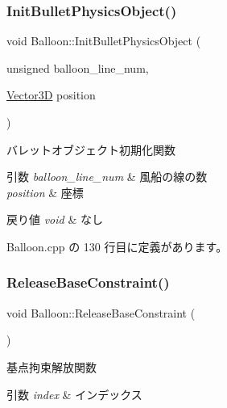 \subsubsection{\texorpdfstring{Init\+Bullet\+Physics\+Object()}{InitBulletPhysicsObject()}}
{\footnotesize\ttfamily void Balloon\+::\+Init\+Bullet\+Physics\+Object (\begin{DoxyParamCaption}\item[{unsigned}]{balloon\+\_\+line\+\_\+num,  }\item[{\mbox{\hyperlink{class_vector3_d}{Vector3D}}}]{position }\end{DoxyParamCaption})\hspace{0.3cm}{\ttfamily [private]}}



バレットオブジェクト初期化関数 


\begin{DoxyParams}{引数}
{\em balloon\+\_\+line\+\_\+num} & 風船の線の数 \\
\hline
{\em position} & 座標 \\
\hline
\end{DoxyParams}

\begin{DoxyRetVals}{戻り値}
{\em void} & なし \\
\hline
\end{DoxyRetVals}


 Balloon.\+cpp の 130 行目に定義があります。

\mbox{\label{class_balloon_a01a2400bc5bbe5a58e8605c1a21af2d5}} 
\subsubsection{\texorpdfstring{Release\+Base\+Constraint()}{ReleaseBaseConstraint()}}
{\footnotesize\ttfamily void Balloon\+::\+Release\+Base\+Constraint (\begin{DoxyParamCaption}{ }\end{DoxyParamCaption})}



基点拘束解放関数 


\begin{DoxyParams}{引数}
{\em index} & インデックス \\
\hline
\end{DoxyParams}

